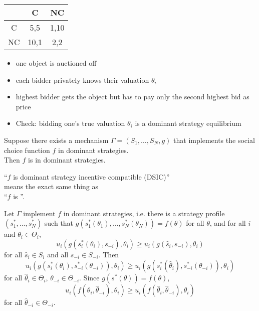 \documentclass[english,handout]{beamer}		%
\def\lyxframeend{} %
\begin{document}
\begin{example}
	\begin{center}
		\begin{tabular}{c | c | c |}
			& C & NC\\ \hline
			C& 5,5 &1,10\\ \hline
			NC&10,1&2,2\\ \hline
		\end{tabular}
	\end{center}
\end{example}
\lyxframeend


\begin{example}
	\begin{itemize}
		\item one object is auctioned off
		\item each bidder privately knows their valuation $\theta_{i}$ 
		\item highest bidder gets the object but has to pay only the second highest bid as price
		\item Check: bidding one's true valuation $\theta_{i}$ is a dominant strategy equilibrium
	\end{itemize}
\end{example}
\lyxframeend


\begin{theorem}
	Suppose there exists a mechanism $\Gamma=(S_{1},\dots,S_{N},g)$ that implements the social choice function $f$ in dominant strategies.\\ Then $f$ is  in dominant strategies.
\end{theorem}
\pause\medskip
\begin{definition}
	``$f$ is \alert{dominant strategy incentive compatible} (DSIC)''\\ 
	means the exact same thing as \\
	``$f$ is ''.
\end{definition}
\lyxframeend


Let $\Gamma$ implement $f$ in dominant strategies, i.e. there is a strategy profile  $(s_1^*,\dots,s_N^*)$ such that $g(s_1^*(\theta_{1}),\dots,s_N^*(\theta_{N}))=f(\theta)$ for all $\theta$, and for all $i$ and  $\theta_{i}\in\Theta_{i}$,
$$ u_{i}(g(s_{i}^{*}(\theta_{i}),s_{-i}),\theta_{i})\geq u_{i}(g(\hat s_{i},s_{-i}),\theta_{i})$$
for all $\hat s_{i}\in S_{i}$ and all $s_{-i}\in S_{-i}$. 
\pause
Then
$$ u_{i}(g(s_{i}^{*}(\theta_{i}), s_{-i}^{*}(\theta_{-i})),\theta_{i})\geq u_i (g(s^*_i(\hat{\theta}_i), s_{-i}^{*}(\theta_{-i})), \theta_i)$$
for all $\hat{\theta}_i \in \Theta_i$, $\theta_{-i} \in \Theta_{-i}$. 
\pause
Since $g(s^*(\theta)) = f(\theta)$,
$$ u_i (f(\theta_i,\hat{\theta}_{-i}),\theta_i) \geq u_i (f(\hat{\theta}_i,\hat{\theta}_{-i}), \theta_i)$$
for all $\hat{\theta}_{-i} \in \Theta_{-i}$.
\vspace{-1ex}
\lyxframeend
\end{document}
